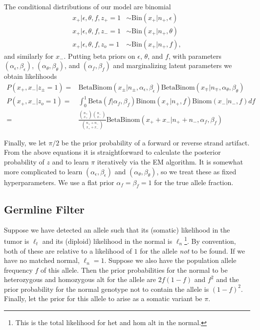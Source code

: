 \documentclass[nofootinbib,amssymb,amsmath]{revtex4}
\begin{document}
The conditional distributions of our model are binomial
\begin{align}
x_+ | \epsilon, \theta, f, z_+ = 1 &\sim \text{Bin} (x_+ | n_+, \epsilon) \\
x_+ | \epsilon, \theta, f, z_- = 1 &\sim \text{Bin} (x_+ | n_+, \theta) \\
x_+ | \epsilon, \theta, f, z_o = 1 &\sim \text{Bin} (x_+ | n_+, f),
\end{align}
and similarly for $x_-$.  Putting beta priors on $\epsilon$, $\theta$, and $f$, with parameters $(\alpha_\epsilon, \beta_\epsilon)$, $(\alpha_\theta, \beta_\theta)$, and $(\alpha_f, \beta_f)$ and marginalizing latent parameters we obtain likelihoods
\begin{align}
P(x_+, x_- | z_\pm = 1) =& \text{BetaBinom}(x_\pm | n_\pm, \alpha_\epsilon, \beta_\epsilon) \text{BetaBinom}(x_\mp | n_\mp, \alpha_\theta, \beta_\theta) \\
P(x_+, x_- | z_o = 1) =& \int_0^1 \text{Beta}(f | \alpha_f, \beta_f) \text{Binom}(x_+ | n_+, f) \text{Binom}(x_- | n_-, f) df \\ 
                                  =& \frac{ \binom{n_+}{x_+} \binom{n_-}{x_-}}{\binom{n_+ + n_-}{x_+ + x_-}} \text{BetaBinom}(x_+ + x_- | n_+ + n_-, \alpha_f, \beta_f)
\end{align}

Finally, we let $\pi/2$ be the prior probability of a forward or reverse strand artifact.  From the above equations it is straightforward to calculate the posterior probability of $z$ and to learn $\pi$ iteratively via the EM algorithm.  It is somewhat more complicated to learn $(\alpha_\epsilon, \beta_\epsilon)$ and $(\alpha_\theta, \beta_\theta)$, so we treat these as fixed hyperparameters.  We use a flat prior $\alpha_f = \beta_f = 1$ for the true allele fraction.

\subsection{Germline Filter}\label{germline-filter}
Suppose we have detected an allele such that its (somatic) likelihood in the tumor is $\ell_t$ and its (diploid) likelihood in the normal is $\ell_n$\footnote{This is the total likelihood for het and hom alt in the normal.}.  By convention, both of these are relative to a likelihood of $1$ for the allele \textit{not} to be found.  If we have no matched normal, $\ell_n = 1$.  Suppose we also have the population allele frequency $f$ of this allele.  Then the prior probabilities for the normal to be heterozygous and homozygous alt for the allele are $2f(1-f)$ and $f^2$ and the prior probability for the normal genotype not to contain the allele is $(1-f)^2$.  Finally, let the prior for this allele to arise as a somatic variant be $\pi$.
\end{document}
